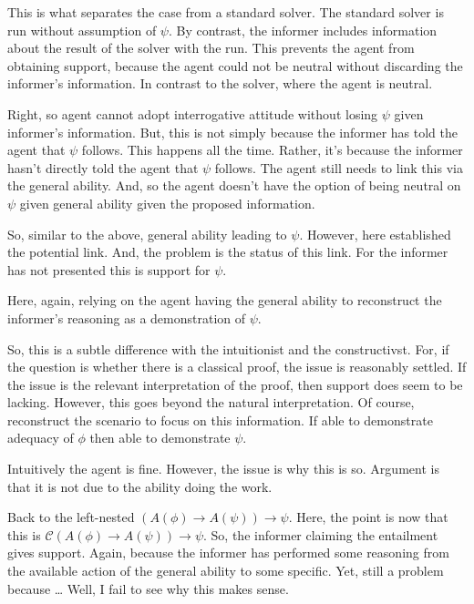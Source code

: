 \documentclass[10pt]{article}
\newcommand{\hozlinedash}[0]{%
  \noindent\hdashrule[0.5ex][c]{\textwidth}{.1pt}{2.5pt}
}
\begin{document}
This is what separates the case from a standard solver.
The standard solver is run without assumption of \(\psi\).
By contrast, the informer includes information about the result of the solver with the run.
This prevents the agent from obtaining support, because the agent could not be neutral without discarding the informer's information.
In contrast to the solver, where the agent is neutral.

Right, so agent cannot adopt interrogative attitude without losing \(\psi\) given informer's information.
But, this is not simply because the informer has told the agent that \(\psi\) follows.
This happens all the time.
Rather, it's because the informer hasn't directly told the agent that \(\psi\) follows.
The agent still needs to link this via the general ability.
And, so the agent doesn't have the option of being neutral on \(\psi\) given general ability given the proposed information.

So, similar to the above, general ability leading to \(\psi\).
However, here established the potential link.
And, the problem is the status of this link.
For the informer has not presented this is support for \(\psi\).

Here, again, relying on the agent having the general ability to reconstruct the informer's reasoning as a demonstration of \(\psi\).

So, this is a subtle difference with the intuitionist and the constructivst.
For, if the question is whether there is a classical proof, the issue is reasonably settled.
If the issue is the relevant interpretation of the proof, then support does seem to be lacking.
However, this goes beyond the natural interpretation.
Of course, reconstruct the scenario to focus on this information.
If able to demonstrate adequacy of \(\phi\) then able to demonstrate \(\psi\).

Intuitively the agent is fine.
However, the issue is why this is so.
Argument is that it is not due to the ability doing the work.

\hozlinedash

Back to the left-nested \((A(\phi) \rightarrow A(\psi)) \rightarrow \psi\).
Here, the point is now that this is \(\mathcal{C}(A(\phi) \rightarrow A(\psi)) \rightarrow \psi\).
So, the informer claiming the entailment gives support.
Again, because the informer has performed some reasoning from the available action of the general ability to some specific.
Yet, still a problem because \dots
Well, I fail to see why this makes sense.
\end{document}
